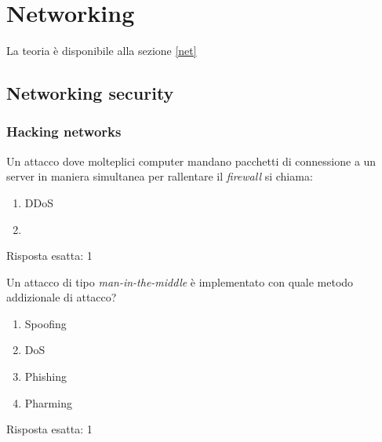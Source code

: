 \chapter{Networking}
\label{EsNet}

La teoria è disponibile alla sezione \ref{net}

\section{Networking security}

\subsection{Hacking networks}

\label{EsHacknet}

\begin{Exercise} [
  title={Quiz},
  label={net1}
  ]

  \Question Un attacco dove molteplici computer mandano pacchetti di
connessione a un server in maniera simultanea per rallentare il
\textit{firewall} si chiama:
\begin{enumerate}
 \item DDoS
 \item {}
\end{enumerate}

\end{Exercise}


\begin{Answer} [
  ref={net1},
  number={1}
  ]

  \Question Risposta esatta: 1

\end{Answer}



\begin{Exercise} [
  title={Quiz},
  label={net2}
  ]

  \Question Un attacco di tipo \textit{man-in-the-middle} è implementato con
quale metodo addizionale di attacco?
\begin{enumerate}
 \item Spoofing
 \item DoS
 \item Phishing
 \item Pharming
\end{enumerate}

\end{Exercise}


\begin{Answer} [
  ref={net2},
  number={2}
  ]

  \Question Risposta esatta: 1

\end{Answer}
